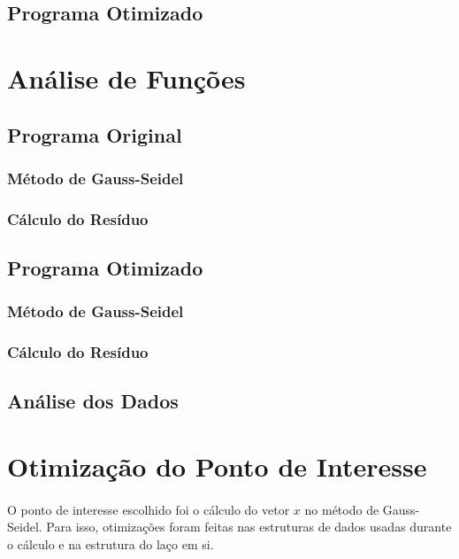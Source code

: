 \documentclass[12pt]{article}
\begin{document}
	\subsection{Programa Otimizado}
\newpage

\section{Análise de Funções}

	\subsection{Programa Original}
		\subsubsection{Método de Gauss-Seidel}
		\subsubsection{Cálculo do Resíduo}
	
	\subsection{Programa Otimizado}
		\subsubsection{Método de Gauss-Seidel}
		\subsubsection{Cálculo do Resíduo}

	\subsection{Análise dos Dados}

\newpage

\section{Otimização do Ponto de Interesse}

\paragraph{}
O ponto de interesse escolhido foi o cálculo do vetor $x$ no método de Gauss-Seidel.
Para isso, otimizações foram feitas nas estruturas de dados usadas durante o cálculo e na estrutura do laço em si.
\end{document}
